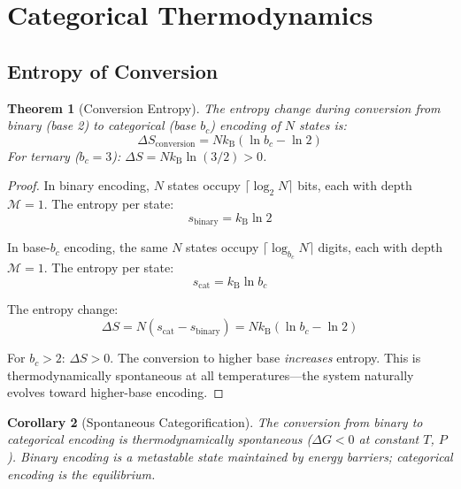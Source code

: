 \documentclass[twocolumn,10pt]{article}
\newtheorem{theorem}{Theorem}[section]
\newtheorem{corollary}[theorem]{Corollary}
\theoremstyle{remark}
\newcommand{\kB}{k_{\mathrm{B}}}
\newcommand{\Depth}{\mathcal{M}}
\begin{document}
\section{Categorical Thermodynamics}
\label{sec:thermodynamics}

\subsection{Entropy of Conversion}

\begin{theorem}[Conversion Entropy]
\label{thm:conversion_entropy}
The entropy change during conversion from binary (base 2) to categorical (base $b_c$) encoding of $N$ states is:
\begin{equation}
    \Delta S_{\text{conversion}} = N \kB (\ln b_c - \ln 2)
\end{equation}
For ternary ($b_c = 3$): $\Delta S = N \kB \ln(3/2) > 0$.
\end{theorem}

\begin{proof}
In binary encoding, $N$ states occupy $\lceil \log_2 N \rceil$ bits, each with depth $\Depth = 1$. The entropy per state:
\begin{equation}
    s_{\text{binary}} = \kB \ln 2
\end{equation}

In base-$b_c$ encoding, the same $N$ states occupy $\lceil \log_{b_c} N \rceil$ digits, each with depth $\Depth = 1$. The entropy per state:
\begin{equation}
    s_{\text{cat}} = \kB \ln b_c
\end{equation}

The entropy change:
\begin{equation}
    \Delta S = N(s_{\text{cat}} - s_{\text{binary}}) = N\kB(\ln b_c - \ln 2)
\end{equation}

For $b_c > 2$: $\Delta S > 0$. The conversion to higher base \emph{increases} entropy. This is thermodynamically spontaneous at all temperatures---the system naturally evolves toward higher-base encoding.
\end{proof}

\begin{corollary}[Spontaneous Categorification]
\label{cor:spontaneous}
The conversion from binary to categorical encoding is thermodynamically spontaneous ($\Delta G < 0$ at constant $T$, $P$). Binary encoding is a metastable state maintained by energy barriers; categorical encoding is the equilibrium.
\end{corollary}
\end{document}

